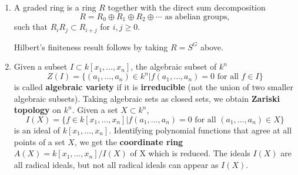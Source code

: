 \begin{enumerate}
            
      \item
            A graded ring is a ring $R$ together with the direct sum decomposition
            $$R=R_0\oplus R_1 \oplus R_2\oplus\cdots \text{ as abelian groups},$$
            such that $R_iR_j \subset R_{i+j}$ for $i,j\geq 0$.
            
            Hilbert's finiteness result follows by taking $R=S^G$ above.
      \item
            Given a subset $I\subset k[x_1,\ldots,x_n]$, the algebraic subset of $k^n$
            $$Z(I)=\{(a_1,\ldots,a_n)\in k^n | f(a_1,\ldots,a_n)=0\text{ for all }f\in I\}$$
            is called \textbf{algebraic variety} if it is \textbf{irreducible} (not the union of two smaller
            algebraic subsets). Taking algebraic sets as closed sets, we obtain \textbf{Zariski topology} on $k^n$.
            Given a set $X\subset k^n$, $$I(X) =\{f\in k[x_1,\ldots,x_n]|f(a_1,\ldots,a_n)=0\text{ for all }
                  (a_1,\ldots,a_n)\in X\}$$ is an ideal of $k[x_1,\ldots,x_n]$. Identifying polynomial functions that
            agree at all points of a set $X$, we get the \textbf{coordinate ring} $A(X)=k[x_1,\ldots,x_n]/I(X)$ of X
            which is reduced. The ideals $I(X)$ are all radical ideals, but not all radical ideals can appear as $I(X)$.

            
\end{enumerate}